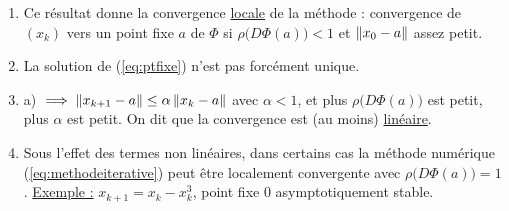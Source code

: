 \begin{remark}
    \begin{enumerate}[label=-]
        \item Ce résultat donne la convergence \underline{locale} de la méthode :
              convergence de  $(x_k)$ vers un point fixe $a$ de $\Phi$ si
              $\rho \big(D\Phi(a) \big)<1$ et $\left\lVert x_0-a\right\rVert$ assez petit.
        \item La solution de (\ref{eq:ptfixe}) n'est pas forcément unique.
        \item a) $\implies \left\lVert x_{k+1}-a\right\rVert \leq \alpha \left\lVert x_k-a\right\rVert$ avec
              $\alpha < 1$, et plus $\rho \big( D\Phi(a) \big)$ est petit, plus
              $\alpha$ est petit. On dit que la convergence est (au moins)
              \underline{linéaire}.
        \item Sous l'effet des termes non linéaires, dans certains cas la méthode
            numérique (\ref{eq:methodeiterative}) peut être localement convergente
            avec $\rho \big( D\Phi(a) \big) = 1$. \underline{Exemple :} $x_{k+1} = x_k - x_k^3$, point fixe 0 asymptotiquement stable.
    \end{enumerate}
\end{remark}

